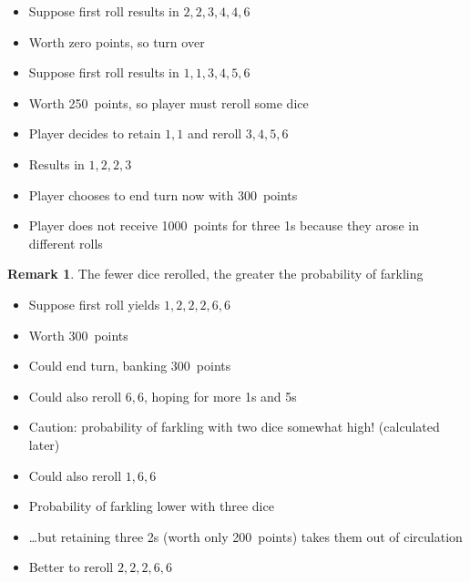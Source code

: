 \documentclass{beamer}
\theoremstyle{definition}
\newtheorem{remark}{Remark}
\begin{document}
\begin{frame}
\begin{example}
\begin{itemize}
\item Suppose first roll results in $2,2,3,4,4,6$
\item Worth zero points, so turn over
\end{itemize}
\end{example}
\begin{example}
\begin{itemize}
\item Suppose first roll results in $1,1,3,4,5,6$
\item Worth 250~points, so player must reroll \alert{some}
dice
\item Player decides to retain $1,1$ and reroll $3,4,5,6$
\item Results in $1,2,2,3$
\item Player chooses to end turn now with 300~points
\item Player does \alert{not} receive 1000~points for three 1s
because they arose in different rolls
\end{itemize}
\end{example}
\begin{remark}
The fewer dice rerolled, the greater
the probability of farkling
\end{remark}
\end{frame}

\begin{frame}
\begin{example}
\begin{itemize}
\item Suppose first roll yields $1,2,2,2,6,6$
\item Worth 300~points
\item Could end turn, banking 300~points
\item Could also reroll $6,6$, hoping for more 1s and 5s
\item \alert{Caution:}
probability of farkling with two dice somewhat high!
(calculated later)
\item Could also reroll $1,6,6$
\item Probability of farkling lower with three dice
\item \dots but retaining three 2s 
(worth only 200~points)
takes them out of circulation
\item Better to reroll $2,2,2,6,6$
\end{itemize}
\end{example}
\end{frame}
\end{document}
